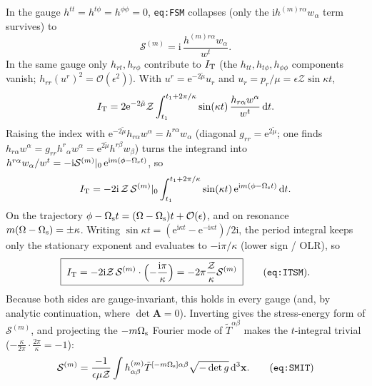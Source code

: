 \documentclass{article}
\newcommand{\rmi}{\mathrm{i}}
\newcommand{\rmd}{\mathrm{d}}
\newcommand{\rme}{\mathrm{e}}
\newcommand{\mass}{\mu}
\newcommand{\mmu}{\tilde\mu}
\begin{document}
In the gauge $h^{tt}=h^{t\phi}=h^{\phi\phi}=0$, \texttt{eq:FSM} collapses (only the $\rmi h^{(m)r\alpha}w_\alpha$
term survives) to
\begin{equation}
  \mathcal{S}^{(m)}=\rmi\,\frac{h^{(m)r\alpha}w_\alpha}{w^t}.
\end{equation}
In the same gauge only $h_{rt},h_{r\phi}$ contribute to $I_{\rm T}$ (the $h_{tt},h_{t\phi},h_{\phi\phi}$
components vanish; $h_{rr}(u^r)^2=\mathcal{O}(\epsilon^2)$). With $u^r=\rme^{-2\mmu}u_r$ and
$u_r=p_r/\mass=\epsilon\mathcal{Z}\sin\kappa t$,
\begin{equation}
  I_{\rm T}=2\rme^{-2\mmu}\mathcal{Z}\int_{t_1}^{t_1+2\pi/\kappa}\sin(\kappa t)\,
  \frac{h_{r\alpha}w^\alpha}{w^t}\,\rmd t.
\end{equation}
Raising the index with $\rme^{-2\mmu}h_{r\alpha}w^\alpha=h^{r\alpha}w_\alpha$ (diagonal $g_{rr}=\rme^{2\mmu}$;
one finds $h_{r\alpha}w^\alpha=g_{rr}h^{r}{}_\alpha w^\alpha=\rme^{2\mmu}h^{r\beta}w_\beta$) turns the integrand
into $h^{r\alpha}w_\alpha/w^t=-\rmi\mathcal{S}^{(m)}|_0\,\rme^{\rmi m(\phi-\Omega_{\rm s}t)}$, so
\begin{equation}
  I_{\rm T}=-2\rmi\,\mathcal{Z}\,\mathcal{S}^{(m)}|_0\int_{t_1}^{t_1+2\pi/\kappa}
  \sin(\kappa t)\,\rme^{\rmi m(\phi-\Omega_{\rm s}t)}\,\rmd t.
\end{equation}
On the trajectory $\phi-\Omega_{\rm s}t=(\Omega-\Omega_{\rm s})t+\mathcal{O}(\epsilon)$, and on resonance
$m(\Omega-\Omega_{\rm s})=\pm\kappa$. Writing $\sin\kappa t=(\rme^{\rmi\kappa t}-\rme^{-\rmi\kappa t})/2\rmi$, the
period integral keeps only the stationary exponent and evaluates to $-\rmi\pi/\kappa$ (lower sign / OLR), so
\begin{equation}
  \boxed{\;I_{\rm T}=-2\rmi\mathcal{Z}\,\mathcal{S}^{(m)}\cdot\Bigl(-\frac{\rmi\pi}{\kappa}\Bigr)
  =-2\pi\frac{\mathcal{Z}}{\kappa}\mathcal{S}^{(m)}\;}\qquad(\texttt{eq:ITSM}).
\end{equation}
Because both sides are gauge-invariant, this holds in every gauge (and, by analytic continuation, where
$\det\mathbf{A}=0$). Inverting gives the stress-energy form of $\mathcal{S}^{(m)}$, and projecting the
$-m\Omega_{\rm s}$ Fourier mode of $\tilde T^{\alpha\beta}$ makes the $t$-integral trivial
($-\tfrac{\kappa}{2\pi}\cdot\tfrac{2\pi}{\kappa}=-1$):
\begin{equation}
  \mathcal{S}^{(m)}=\frac{-1}{\epsilon\mass\mathcal{Z}}\int h^{(m)}_{\alpha\beta}
  \tilde T^{[-m\Omega_{\rm s}]\alpha\beta}\sqrt{-\det g}\,\rmd^3\mathbf{x}.
  \tag{\texttt{eq:SMIT}}
\end{equation}
\end{document}
